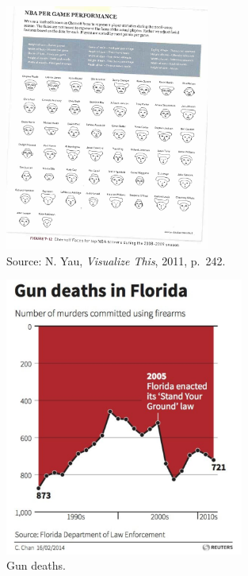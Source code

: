 \documentclass[
  letterpaper,
  DIV=11,
  numbers=noendperiod]{scrreprt}
\begin{document}
\begin{figure}[H]

{\centering \includegraphics[width=0.6\textwidth,height=\textheight]{src/../images/chernoff.png}

}

\caption{Source: N. Yau, \emph{Visualize This}, 2011, p.~242.}

\end{figure}%

\hfill\break
\hfill\break
\hfill\break

\begin{figure}[H]

{\centering \includegraphics[width=0.7\textwidth,height=\textheight]{src/../images/badviz2.png}

}

\caption{Gun deaths.}

\end{figure}%
\end{document}
